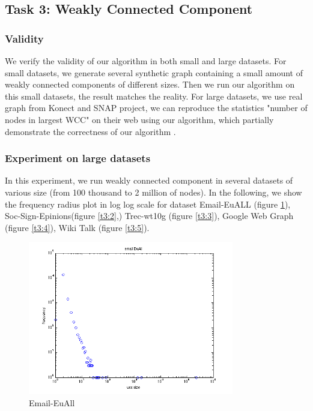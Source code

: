 \subsection{Task 3: Weakly Connected Component}
\subsubsection{Validity}
We verify the validity of our algorithm in both small and large datasets. For small datasets, we generate several synthetic graph containing a small amount of weakly connected components of different sizes. Then we run our algorithm on this small datasets, the result matches the reality. For large datasets, we use real graph from Konect and SNAP project, we can reproduce the statistics "number of nodes in largest WCC" on their web using our algorithm, which partially demonstrate the correctness of our algorithm .


\subsubsection{Experiment on large datasets}
In this experiment, we run weakly connected component in several datasets of various size (from 100 thousand to 2 million of nodes). In the following, we show the frequency radius plot in log log scale for dataset Email-EuALL (figure \ref{t3:1}), Soc-Sign-Epinions(figure \ref{t3:2},) Trec-wt10g (figure \ref{t3:3}), Google Web Graph (figure \ref{t3:4}), Wiki Talk (figure \ref{t3:5}). 
\begin{figure}[!htbf]
\begin{center}
     \includegraphics[width=0.8\textwidth]{FIG/t3_email_euall.png} 
\caption{Email-EuAll }
\label{t3:1}
\end{center}
\end{figure}

